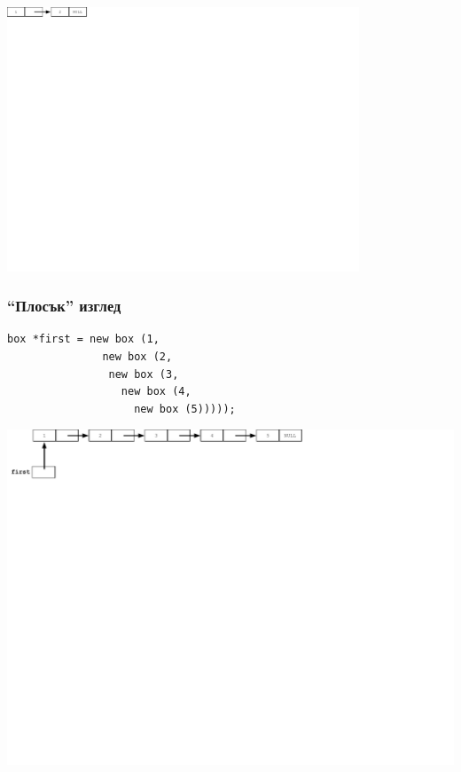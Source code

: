 \documentclass{beamer}
\begin{document}
\begin{frame}[fragile]
\includegraphics[width=10.5cm]{images/01_llbox_twoboxes.pdf}


\end{frame}


\begin{frame}[fragile]
\frametitle{``Плосък'' изглед}

\begin{flushleft}
\begin{lstlisting}
box *first = new box (1,
               new box (2, 
                new box (3, 
                  new box (4, 
                    new box (5)))));
\end{lstlisting}  
\end{flushleft}


\includegraphics[width=14.0cm]{images/02_ll_flatchain}

\end{frame}
\end{document}
